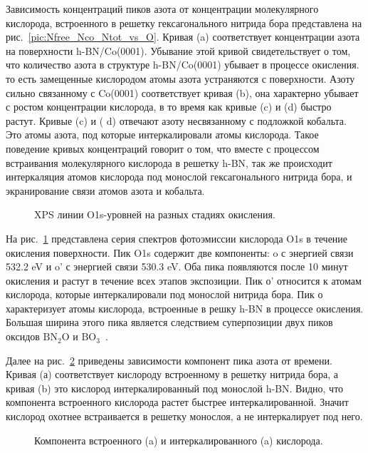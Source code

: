 Зависимость концентраций пиков азота от концентрации молекулярного кислорода, встроенного в решетку гексагонального нитрида бора
представлена на рис.~\ref{pic:Nfree_Nco_Ntot_vs_O}. Кривая (a) соответствует концентрации азота на поверхности
h-BN/Co(0001). Убывание этой кривой свидетельствует о том, что количество азота в структуре h-BN/Co(0001) убывает в процессе
окисления. то есть замещенные кислородом атомы азота устраняются с поверхности. Азоту сильно связанному с Co(0001) соответствует 
кривая (b), она характерно убывает с ростом концентрации кислорода, в то время как кривые (c) и (d) быстро растут. Кривые (c) и (
d) отвечают азоту несвязанному с подложкой кобальта. Это атомы азота, под которые интеркалировали атомы кислорода. Такое поведение 
кривых концентраций говорит о том, что вместе с процессом встраивания молекулярного кислорода в решетку h-BN, так же происходит 
интеркаляция атомов кислорода под монослой гексагонального нитрида бора, и экранирование связи атомов азота и кобальта.


\begin{figure}[!ht]
\caption{XPS линии O1s-уровней на разных стадиях окисления.}
\label{pic:O1s_all}
\end{figure}
На рис.~\ref{pic:O1s_all} представлена серия спектров фотоэмиссии кислорода O1s в течение окисления поверхности.
Пик O1s содержит две компоненты: o с энергией связи 532.2 eV и o' с энергией связи 530.3 eV. Оба пика появляются
после 10 минут окисления и растут в течение всех этапов экспозиции. Пик о' относится к атомам кислорода, которые
интеркалировали под монослой нитрида бора. Пик о характеризует атомы кислорода, встроенные в решку h-BN в процессе
окисления. Большая ширина этого пика является следствием суперпозиции двух пиков оксидов $\mathrm{BN_2O}$ и
$\mathrm{BO_3}$~\cite{Shevelev2019_h-BN/Co_oxydation}. 


Далее на рис.~\ref{pic:O_components_vs_time} приведены зависимости компонент пика азота от времени. Кривая (а) соответствует кислороду 
встроенному в решетку нитрида бора, а кривая (b) это кислород интеркалированный под монослой h-BN. Видно,
что компонента встроенного кислорода растет быстрее интеркалированной. Значит кислород охотнее встраивается
в решетку монослоя, а не интеркалирует под него.
\begin{figure}[!ht]
\caption{Компонента встроенного (a) и интеркалированного (a) кислорода.}
\label{pic:O_components_vs_time}
\end{figure}


